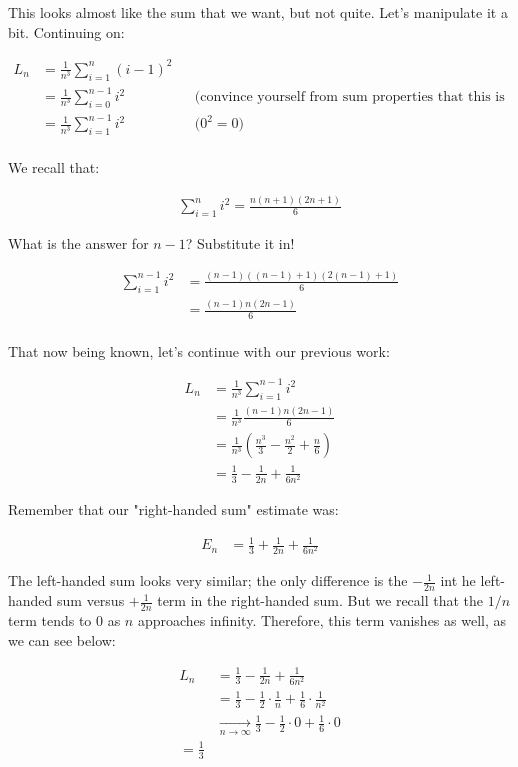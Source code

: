 \documentclass{book}
\begin{document}
This looks almost like the sum that we want, but not quite. Let's manipulate it a bit. Continuing on: 


\begin{align*}
L_n &= \frac{1}{n^3} \sum_{i=1}^n (i-1)^2 \\
&= \frac{1}{n^3} \sum_{i=0}^{n-1} i^2 && \text{(convince yourself from sum properties that this is true)} \\
&= \frac{1}{n^3} \sum_{i=1}^{n-1} i^2 && \text{($0^2 = 0$)} \\
\end{align*}

We recall that:

\begin{align*}
\sum_{i=1}^n i^2 = \frac{n(n+1)(2n+1)}{6}
\end{align*}

What is the answer for $n-1$? Substitute it in!

\begin{align*}
\sum_{i=1}^{n-1} i^2 &= \frac{(n-1)((n-1)+1)(2(n-1)+1)}{6} \\
&= \frac{(n-1)n(2n-1)}{6} \\
\end{align*}


That now being known, let's continue with our previous work:

\begin{align*}
L_n &= \frac{1}{n^3} \sum_{i=1}^{n-1} i^2 \\
&= \frac{1}{n^3} \frac{(n-1)n(2n-1)}{6} \\
&= \frac{1}{n^3} \left( \frac{n^3}{3} - \frac{n^2}{2} + \frac{n}{6} \right) \\
&= \frac{1}{3} - \frac{1}{2n} + \frac{1}{6n^2}
\end{align*}

Remember that our "right-handed sum" estimate was:

\begin{align*}
E_n &= \frac{1}{3} + \frac{1}{2n} + \frac{1}{6n^2}
\end{align*}

The left-handed sum looks very similar; the only difference is the $- \frac{1}{2n}$ int he left-handed sum versus $+ \frac{1}{2n}$ term in the right-handed sum. But we recall that the $1/n$ term tends to 0 as $n$ approaches infinity. Therefore, this term vanishes as well, as we can see below: 

\begin{align*}
L_n &= \frac{1}{3} - \frac{1}{2n} + \frac{1}{6n^2} \\
&= \frac{1}{3} - \frac{1}{2} \cdot \frac{1}{n} + \frac{1}{6} \cdot \frac{1}{n^2} \\
&\xrightarrow[n \to \infty]{} \frac{1}{3} - \frac{1}{2} \cdot 0 + \frac{1}{6} \cdot 0 \\
= \frac{1}{3}
\end{align*}
\end{document}
